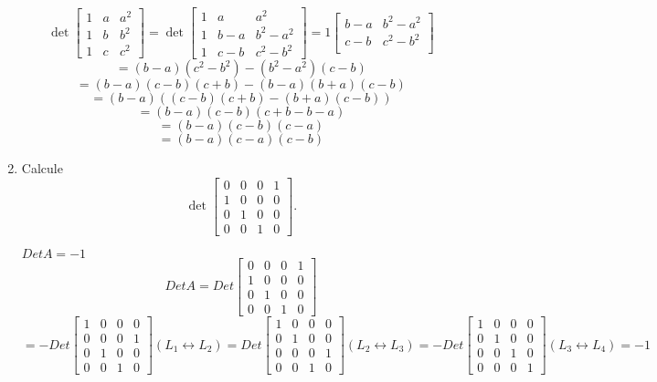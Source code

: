 \documentclass[leqno]{article}
\numberwithin{equation}{section}
\begin{document}
\begin{enumerate}
\begin{sol}
		$$\det \begin{bmatrix}
			 1 & a & a^2 \\
			  1 & b & b^2 \\
			   1 & c & c^2 \end{bmatrix} = 
		   \det \begin{bmatrix}
		   	1 & a & a^2 \\
		   	1 & b-a & b^2 - a^2 \\
		   	1 & c-b & c^2 - b^2
	   		\end{bmatrix} = 
	   	1 \begin{bmatrix}
	   		b-a & b^2 - a^2 \\
	   		c-b & c^2 - b^2 \\
		  \end{bmatrix}$$
	  $$= (b - a)(c^2 - b^2) - (b^2 - a^2)(c-b)$$
	  $$= (b - a)(c - b)(c + b) - (b - a)(b + a)(c - b)$$
	  $$= (b - a)((c - b)(c + b)-(b + a)(c - b))$$
	  $$= (b - a)(c - b)( c + b - b - a)$$
	  $$= (b - a)(c - b)(c - a)$$
	  $$= (b-a)(c-a)(c-b)$$
		\end{sol}
		
		
		\item Calcule
		$$\det \begin{bmatrix} 0 & 0 & 0 & 1 \\ 1 & 0 & 0 & 0 \\ 0 & 1 & 0 & 0 \\ 0 & 0 & 1 & 0  \end{bmatrix}.$$
		
		\begin{sol}
			$DetA = -1$
			$$DetA = Det\begin{bmatrix}
			0 & 0 & 0 & 1 \\
			1 & 0 & 0 & 0 \\
			0 & 1 & 0 & 0 \\
			0 & 0 & 1 & 0  
		    \end{bmatrix}$$ $$= -Det\begin{bmatrix}
		    1 & 0 & 0 & 0 \\
		    0 & 0 & 0 & 1 \\
		    0 & 1 & 0 & 0 \\
		    0 & 0 & 1 & 0  
	   		\end{bmatrix} (L_1 \leftrightarrow L_2) = Det\begin{bmatrix}
	   		1 & 0 & 0 & 0 \\
	   		0 & 1 & 0 & 0 \\
	   		0 & 0 & 0 & 1 \\
	   		0 & 0 & 1 & 0  
	   		\end{bmatrix} (L_2 \leftrightarrow L_3) = -Det\begin{bmatrix}
	   		1 & 0 & 0 & 0 \\
	   		0 & 1 & 0 & 0 \\
	   		0 & 0 & 1 & 0 \\
	   		0 & 0 & 0 & 1  
	   		\end{bmatrix} (L_3 \leftrightarrow L_4) = -1$$
			

\end{sol}
\end{enumerate}
\end{document}
